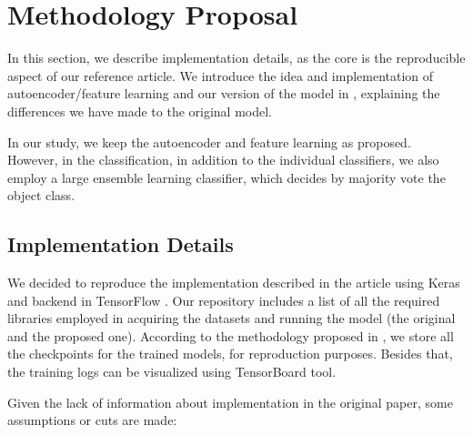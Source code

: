 \section{Methodology Proposal}
\label{sec:propose}

In this section, we describe implementation details, as the core is the reproducible aspect of our reference article. We introduce the idea and implementation of autoencoder/feature learning and our version of the model in \cite{WenZha:2018}, explaining the differences we have made to the original model.

In our study, we keep the autoencoder and feature learning as proposed. However, in the classification, in addition to the individual classifiers, we also employ a large ensemble learning classifier, which decides by majority vote the object class.

\subsection{Implementation Details}

We decided to reproduce the implementation described in the article using Keras \cite{chollet2018keras} and backend in TensorFlow \cite{tensorflow}. Our repository includes a list of all the required libraries employed in acquiring the datasets and running the model (the original and the proposed one). According to the methodology proposed in \cite{Fuente:2019}, we store all the checkpoints for the trained models, for reproduction purposes. Besides that, the training logs can be visualized using TensorBoard tool.

Given the lack of information about implementation in the original paper, some assumptions or cuts are made: 


